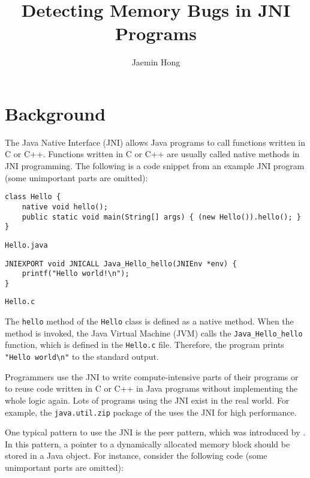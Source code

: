 \documentclass[acmsmall,screen]{acmart}
\begin{document}
\title{Detecting Memory Bugs in JNI Programs}
\author{Jaemin Hong}
\maketitle

\section{Background}

The Java Native Interface (JNI) allows Java programs to call functions written
in C or C++. Functions written in C or C++ are usually called native methods
in JNI programming. The following is a code snippet from an example JNI program
(some unimportant parts are omitted):

\begin{lstlisting}[style=javastyle]
class Hello {
    native void hello();
    public static void main(String[] args) { (new Hello()).hello(); }
}
\end{lstlisting}
\vspace*{-1em}
\begin{flushright}
{\footnotesize\tt Hello.java}
\end{flushright}
\vspace*{-0.5em}
\begin{lstlisting}[style=cstyle]
JNIEXPORT void JNICALL Java_Hello_hello(JNIEnv *env) {
    printf("Hello world!\n");
}
\end{lstlisting}
\vspace*{-1em}
\begin{flushright}
{\footnotesize\tt Hello.c}
\end{flushright}

The {\tt hello} method of the {\tt Hello} class is defined as a native method.
When the method is invoked, the Java Virtual Machine (JVM) calls the
\verb!Java_Hello_hello! function, which is defined in the {\tt Hello.c} file.
Therefore, the program prints \verb!"Hello world\n"! to the standard output.

Programmers use the JNI to write compute-intensive parts of their programs or to
reuse code written in C or C++ in Java programs without implementing the whole
logic again. Lots of programs using the JNI exist in the real world. For
example, the {\tt java.util.zip} package of the \citet{javautilzips}
uses the JNI for high performance.

One typical pattern to use the JNI is the peer pattern, which was introduced by
\citet{liang1999java}. In this pattern, a pointer to a dynamically allocated
memory block should be stored in a Java object. For instance, consider the
following code (some unimportant parts are omitted):
\end{document}
